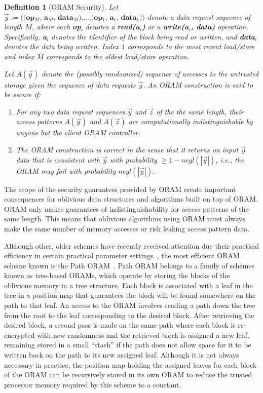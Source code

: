 \documentclass[letterpaper,twocolumn,10pt]{article}
\newtheorem{definition}[theorem]{Definition}
\begin{document}
\begin{definition}[ORAM Security\cite{SDS+13}]
Let $\overrightarrow{y}:=\textbf{((op$_M$, a$_M$, data$_M$),...,(op$_1$, a$_1$, data$_1$))}$ denote a data request sequence of length $M$, where each \textbf{op$_i$} denotes a \textbf{read(a$_i$)} or a \textbf{write(a$_i$, data)} operation. Specifically, \textbf{a$_i$} denotes the identifier of the block being read or written, and \textbf{data$_i$} denotes the data being written. Index $1$ corresponds to the most recent load/store and index $M$ corresponds to the oldest load/store operation.

Let $A(\overrightarrow{y})$ denote the (possibly randomized) sequence of accesses to the untrusted storage given the sequence of data requests $\overrightarrow{y}$. An ORAM construction is said to be secure if:
\begin{enumerate}
\setlength\itemsep{0pt}
\item For any two data request sequences $\overrightarrow{y}$ and $\overrightarrow{z}$ of the the same length, their access patterns $A(\overrightarrow{y})$ and $A(\overrightarrow{z})$ are computationally indistinguishable by anyone but the client ORAM controller.

\item The ORAM construction is correct in the sense that it returns on input $\overrightarrow{y}$ data that is consistent with $\overrightarrow{y}$ with probability $\geq 1 - \textit{negl}(|\overrightarrow{y}|)$, i.e., the ORAM may fail with probability $\textit{negl}(|\overrightarrow{y}|)$.
\end{enumerate}
\end{definition}

The scope of the security guarantees provided by ORAM create important consequences for oblivious data structures and algorithms built on top of ORAM. ORAM only makes guarantees of indistinguishability for access patterns of the same length. This means that oblivious algorithms using ORAM must always make the same number of memory accesses or risk leaking access pattern data.

Although other, older schemes have recently received attention due their practical efficiency in certain practical parameter settings~\cite{ZWR+16}, the most efficient ORAM scheme known is the Path ORAM~\cite{SDS+13}. Path ORAM belongs to a family of schemes known as tree-based ORAMs, which operate by storing the blocks of the oblivious memory in a tree structure. Each block is associated with a leaf in the tree in a position map that guarantees the block will be found somewhere on the path to that leaf. An access to the ORAM involves reading a path down the tree from the root to the leaf corresponding to the desired block. After retrieving the desired block, a second pass is made on the same path where each block is re-encrypted with new randomness and the retrieved block is assigned a new leaf, remaining stored in a small ``stash'' if the path does not allow space for it to be written back on the path to its new assigned leaf. Although it is not always necessary in practice, the position map holding the assigned leaves for each block of the ORAM can be recursively stored in its own ORAM to reduce the trusted processor memory required by this scheme to a constant.
\end{document}
